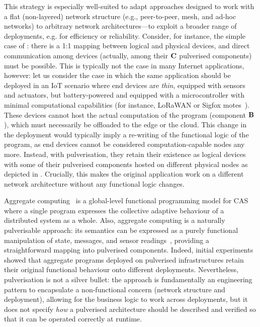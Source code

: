 This strategy is especially well-suited to adapt approaches designed to work with a flat (non-layered) network structure (e.g., peer-to-peer, mesh, and ad-hoc networks) 
 to arbitrary network architectures---to exploit a broader range of deployments, e.g. for efficiency or reliability.
%
Consider, for instance, the simple case of
:
there is a 1:1 mapping between logical and physical devices, and direct communication among devices (actually, among their $\mathbf{C}$ pulverised components) must be possible.
%
This is typically not the case in many Internet applications, however:
let us consider the case in which the same application should be deployed in an IoT scenario where end devices are \emph{thin},
equipped with sensors and actuators, but battery-powered and equipped with a microcontroller with minimal computational capabilities
(for instance, LoRaWAN or Sigfox motes~\cite{MekkiBCM18}).
%
These devices cannot host the actual computation of the program (component $\mathbf{B}$), which must necessarily be offloaded to the edge or the cloud.
%
This change in the deployment would typically imply a re-writing of the functional logic of the program,
as end devices cannot be considered computation-capable nodes any more.
%
Instead, with pulverisation, they retain their existence as logical devices
with some of their pulverised components hosted on different physical nodes as depicted in
.
%
Crucially, this makes the original application work on a different network architecture without any functional logic changes.

Aggregate computing~\cite{DBLP:journals/computer/BealPV15,DBLP:journals/jlap/ViroliBDACP19}
 is a global-level functional programming model for CAS
 where a single program expresses the collective adaptive behaviour of a distributed system as a whole.
Also, aggregate computing is a naturally pulverisable approach:
its semantics can be expressed as a purely functional manipulation of state, messages, and sensor readings~\cite{DBLP:journals/jlap/ViroliBDACP19},
providing a straightforward mapping into pulverised components.
%
Indeed, initial experiments~\cite{DBLP:journals/fi/CasadeiPPVW20}
showed that aggregate programs deployed on pulverised infrastructures retain their original functional behaviour onto different deployments.
%
Nevertheless, pulverisation is not a silver bullet:
the approach is fundamentally an engineering pattern to encapsulate a non-functional concern
(network structure and deployment),
allowing for the business logic to work across deployments,
but it does not specify \emph{how} 
 a pulverised architecture should be described
 and verified so that it can be operated correctly at runtime.

